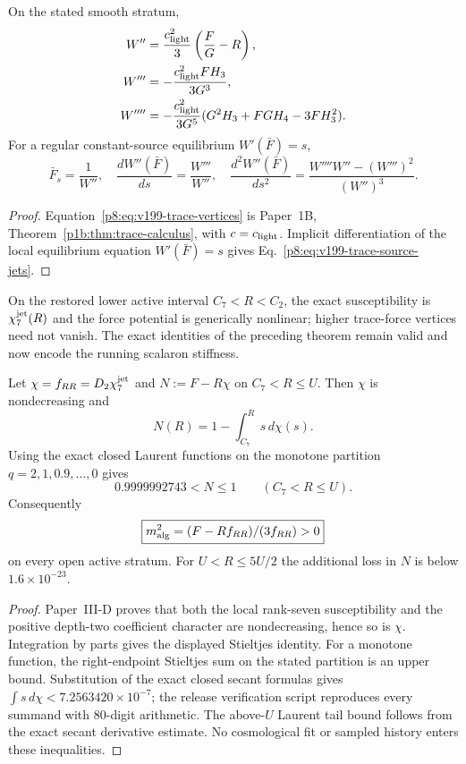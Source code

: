 \documentclass[12pt,a4paper]{article}
\begin{document}
\begin{theorem}
\label{p8:thm:v199-trace-force-vertices}
On the stated smooth stratum,
\begin{align}
 W''&=\frac{c_{\rm light}^2}{3}\left(\frac FG-R\right),\nonumber\\
 W'''&=-\frac{c_{\rm light}^2 F H_3}{3G^3},\nonumber\\
 W''''&=-\frac{c_{\rm light}^2}{3G^5}
       (G^2H_3+FGH_4-3FH_3^2).
 \label{p8:eq:v199-trace-vertices}
\end{align}
For a regular constant-source equilibrium \(W'(\bar F)=s\),
\begin{equation}
 \bar F_s=\frac1{W''},\quad
 \frac{dW''(\bar F)}{ds}=\frac{W'''}{W''},\quad
 \frac{d^2W''(\bar F)}{ds^2}
 =\frac{W''''W''-(W''')^2}{(W'')^3}.
 \label{p8:eq:v199-trace-source-jets}
\end{equation}
\end{theorem}
\begin{proof}
Equation~\eqref{p8:eq:v199-trace-vertices} is Paper~1B,
Theorem~\ref{p1b:thm:trace-calculus}, with \(c=c_{\rm light}\).
Implicit differentiation of the local equilibrium equation
\(W'(\bar F)=s\) gives Eq.~\eqref{p8:eq:v199-trace-source-jets}.
\end{proof}

On the restored lower active interval $C_7<R<C_2$, the exact susceptibility
is $\chi_7^{\rm jet}(R)$ and the force potential is generically nonlinear;
higher trace-force vertices need not vanish.  The exact identities of the
preceding theorem remain valid and now encode the running scalaron stiffness.

\begin{theorem}
\label{p8:thm:v199-uniform-scalar-mass}
Let $\chi=f_{RR}=D_2\chi_7^{\rm jet}$ and $N:=F-R\chi$ on
$C_7<R\le U$.  Then $\chi$ is nondecreasing and
\[
 N(R)=1-\int_{C_7}^R s\,d\chi(s).
\]
Using the exact closed Laurent functions on the monotone partition
$q=2,1,0.9,\ldots,0$ gives
\begin{equation}
\label{p8:eq:v199-uniform-eta}
 \boxed{0.9999992743<N\le1\qquad(C_7<R\le U).}
\end{equation}
Consequently
\[
 \boxed{m_{\rm alg}^2=(F-Rf_{RR})/(3f_{RR})>0}
\]
on every open active stratum.  For $U<R\le5U/2$ the additional loss in $N$
is below $1.6\times10^{-23}$.
\end{theorem}

\begin{proof}
Paper~III-D proves that both the local rank-seven susceptibility and the
positive depth-two coefficient character are nondecreasing, hence so is
$\chi$.  Integration by parts gives the displayed Stieltjes identity.  For a
monotone function, the right-endpoint Stieltjes sum on the stated partition is
an upper bound.  Substitution of the exact closed secant formulas gives
$\int s\,d\chi<7.2563420\times10^{-7}$; the release verification script
reproduces every summand with 80-digit arithmetic.  The above-$U$ Laurent tail
bound follows from the exact secant derivative estimate.  No cosmological fit
or sampled history enters these inequalities.
\end{proof}
\end{document}
